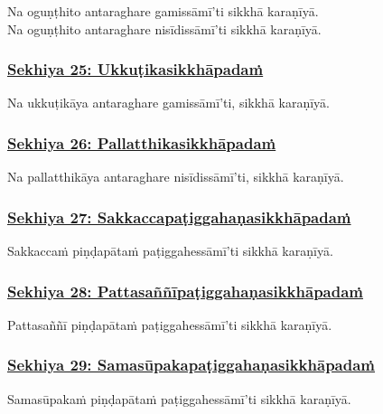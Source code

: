 Na oguṇṭhito antaraghare gamissāmī'ti sikkhā karaṇīyā.\\
Na oguṇṭhito antaraghare nisīdissāmī'ti sikkhā karaṇīyā.



\subsubsection*{\hyperref[training25]{Sekhiya 25: Ukkuṭikasikkhāpadaṁ}}
\label{sekh25}

Na ukkuṭikāya antaraghare gamissāmī'ti, sikkhā karaṇīyā.



\subsubsection*{\hyperref[training26]{Sekhiya 26: Pallatthikasikkhāpadaṁ}}
\label{sekh26}

Na pallatthikāya antaraghare nisīdissāmī'ti, sikkhā karaṇīyā.



\subsubsection*{\hyperref[training27]{Sekhiya 27: Sakkaccapaṭiggahaṇasikkhāpadaṁ}}
\label{sekh27}

Sakkaccaṁ piṇḍapātaṁ paṭiggahessāmī'ti sikkhā karaṇīyā.



\subsubsection*{\hyperref[training28]{Sekhiya 28: Pattasaññīpaṭiggahaṇasikkhāpadaṁ}}
\label{sekh28}

Pattasaññī piṇḍapātaṁ paṭiggahessāmī'ti sikkhā karaṇīyā.



\subsubsection*{\hyperref[training29]{Sekhiya 29: Samasūpakapaṭiggahaṇasikkhāpadaṁ}}
\label{sekh29}

Samasūpakaṁ piṇḍapātaṁ paṭiggahessāmī'ti sikkhā karaṇīyā.



